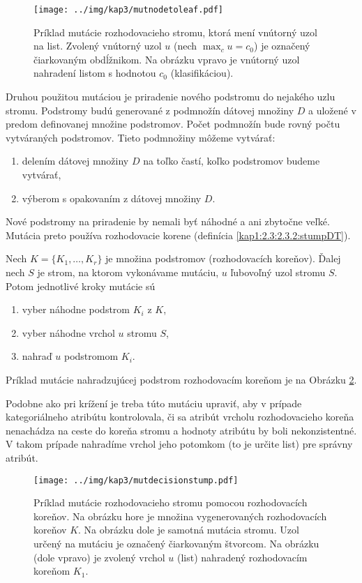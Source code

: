 \begin{figure}[h]
\centering
\centerline{\mbox{\texttt{[image: ../img/kap3/mutnodetoleaf.pdf]}}}
\caption{Príklad mutácie rozhodovacieho stromu, ktorá mení vnútorný uzol na list. Zvolený vnútorný uzol $u$ (nech $\max_c u = c_0$) je označený čiarkovaným obdĺžnikom. Na obrázku vpravo je vnútorný uzol nahradení listom s hodnotou $c_0$ (klasifikáciou).}\label{fig:mutnodetoleaf}
\end{figure}

Druhou použitou mutáciou je priradenie nového podstromu do nejakého uzlu stromu. Podstromy budú generované z podmnožín dátovej množiny $D$ a uložené v predom definovanej množine podstromov. Počet podmnožín bude rovný počtu vytváraných podstromov. Tieto podmnožiny môžeme vytvárať:
\begin{enumerate}
\item delením dátovej množiny $D$ na toľko častí, koľko podstromov budeme vytvárať,
\item výberom s opakovaním z dátovej množiny $D$.
\end{enumerate}
Nové podstromy na priradenie by nemali byť náhodné a ani zbytočne veľké. Mutácia preto používa rozhodovacie korene (definícia \ref{kap1:2.3:2.3.2:stumpDT}).

Nech $K=\{K_1,\ldots,K_r\}$ je množina podstromov (rozhodovacích koreňov). Ďalej nech $S$ je strom, na ktorom vykonávame mutáciu, $u$ ľubovoľný uzol stromu $S$. Potom jednotlivé kroky mutácie sú 
\begin{enumerate}
\item vyber náhodne podstrom $K_i$ z $K$,
\item vyber náhodne vrchol $u$ stromu $S$,
\item nahraď $u$ podstromom $K_i$.
\end{enumerate}
Príklad mutácie nahradzujúcej podstrom rozhodovacím koreňom je na Obrázku \ref{fig:mutdecisionstump}.

Podobne ako pri krížení je treba túto mutáciu upraviť, aby v prípade kategoriálneho atribútu kontrolovala, či sa atribút vrcholu rozhodovacieho koreňa nenachádza na ceste do koreňa stromu a hodnoty atribútu by boli nekonzistentné. V takom prípade nahradíme vrchol jeho potomkom  (to je určite list) pre správny atribút.

\begin{figure}[h]
\centering
\centerline{\mbox{\texttt{[image: ../img/kap3/mutdecisionstump.pdf]}}}
\caption{Príklad mutácie rozhodovacieho stromu pomocou rozhodovacích koreňov. Na obrázku hore je množina vygenerovaných rozhodovacích koreňov $K$. Na obrázku dole je samotná mutácia stromu. Uzol určený na mutáciu je označený čiarkovaným štvorcom. Na obrázku (dole vpravo) je zvolený vrchol $u$ (list) nahradený rozhodovacím koreňom $K_1$. }\label{fig:mutdecisionstump}
\end{figure}
